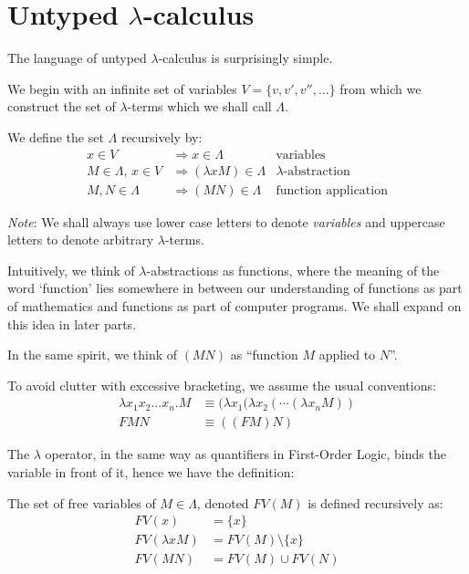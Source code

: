 \section{Untyped $\lambda$-calculus}


The language of untyped $\lambda$-calculus is surprisingly simple.

We begin with an infinite set of variables $V = \{v, v', v'', \ldots\}$ from
which we construct the set of $\lambda$-terms which we shall call $\Lambda$.

\begin{definition}\label{def:untyped-lambda-calc}
We define the set $\Lambda$ recursively by:
\begin{align*}
    x \in V & \Rightarrow x \in \Lambda &
        \text{variables} \\
    M \in \Lambda,\, x \in V & \Rightarrow (\lambda x M) \in \Lambda &
        \text{$\lambda$-abstraction} \\
    M, N \in \Lambda & \Rightarrow (M N) \in \Lambda &
        \text{function application}
\end{align*}
\end{definition}

\emph{Note}: We shall always use lower case letters to denote \emph{variables} and
uppercase letters to denote arbitrary $\lambda$-terms.

Intuitively, we think of $\lambda$-abstractions as functions, where the meaning
of the word `function' lies somewhere in between our understanding of functions as
part of mathematics and functions as part of computer programs. We shall expand
on this idea in later parts.

In the same spirit, we think of $(M N)$ as ``function $M$ applied to $N$''.

To avoid clutter with excessive bracketing, we assume the usual conventions:
\begin{align*}
    \lambda x_1 x_2 \ldots x_n . M &\equiv
        (\lambda x_1 (\lambda x_2 (\cdots (\lambda x_n M)) \\
    F M N &\equiv ((FM)N)
\end{align*}

The $\lambda$ operator, in the same way as quantifiers in First-Order Logic,
binds the variable in front of it, hence we have the definition:
\begin{definition}
    The set of free variables of $M \in \Lambda$, denoted $FV(M)$ is defined
    recursively as:
        \begin{align*}
            FV(x) &= \{x\} \\
            FV(\lambda x M) &= FV(M) \setminus \{x\} \\
            FV(M N) &= FV(M) \cup FV(N)
        \end{align*}
\end{definition}

